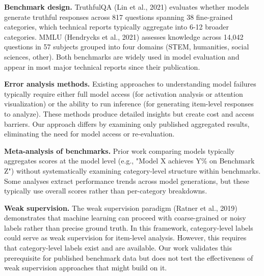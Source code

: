 
\textbf{Benchmark design.} TruthfulQA (Lin et al., 2021) evaluates whether models generate truthful responses across 817 questions spanning 38 fine-grained categories, which technical reports typically aggregate into 6-12 broader categories. MMLU (Hendrycks et al., 2021) assesses knowledge across 14,042 questions in 57 subjects grouped into four domains (STEM, humanities, social sciences, other). Both benchmarks are widely used in model evaluation and appear in most major technical reports since their publication.

\textbf{Error analysis methods.} Existing approaches to understanding model failures typically require either full model access (for activation analysis or attention visualization) or the ability to run inference (for generating item-level responses to analyze). These methods produce detailed insights but create cost and access barriers. Our approach differs by examining only published aggregated results, eliminating the need for model access or re-evaluation.

\textbf{Meta-analysis of benchmarks.} Prior work comparing models typically aggregates scores at the model level (e.g., "Model X achieves Y\% on Benchmark Z") without systematically examining category-level structure within benchmarks. Some analyses extract performance trends across model generations, but these typically use overall scores rather than per-category breakdowns.

\textbf{Weak supervision.} The weak supervision paradigm (Ratner et al., 2019) demonstrates that machine learning can proceed with coarse-grained or noisy labels rather than precise ground truth. In this framework, category-level labels could serve as weak supervision for item-level analysis. However, this requires that category-level labels exist and are available. Our work validates this prerequisite for published benchmark data but does not test the effectiveness of weak supervision approaches that might build on it.
